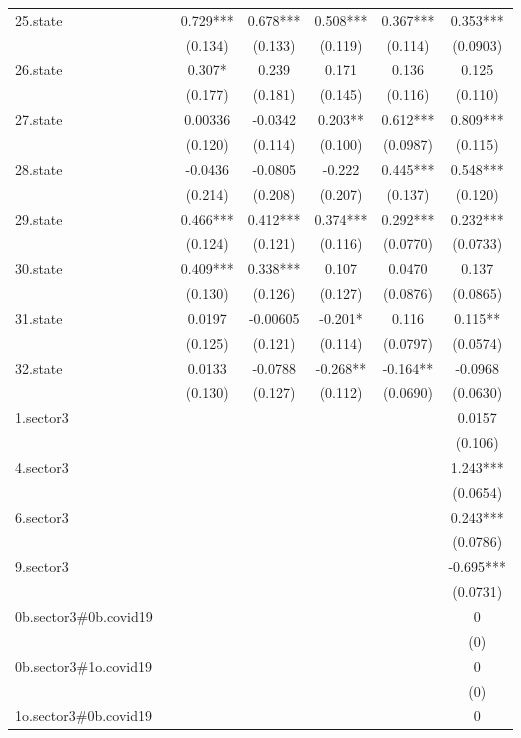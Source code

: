 \documentclass[]{article}
\begin{document}
\begin{tabular}{lcccccc}
25.state &  & 0.729*** & 0.678*** & 0.508*** & 0.367*** & 0.353*** \\
 &  & (0.134) & (0.133) & (0.119) & (0.114) & (0.0903) \\
26.state &  & 0.307* & 0.239 & 0.171 & 0.136 & 0.125 \\
 &  & (0.177) & (0.181) & (0.145) & (0.116) & (0.110) \\
27.state &  & 0.00336 & -0.0342 & 0.203** & 0.612*** & 0.809*** \\
 &  & (0.120) & (0.114) & (0.100) & (0.0987) & (0.115) \\
28.state &  & -0.0436 & -0.0805 & -0.222 & 0.445*** & 0.548*** \\
 &  & (0.214) & (0.208) & (0.207) & (0.137) & (0.120) \\
29.state &  & 0.466*** & 0.412*** & 0.374*** & 0.292*** & 0.232*** \\
 &  & (0.124) & (0.121) & (0.116) & (0.0770) & (0.0733) \\
30.state &  & 0.409*** & 0.338*** & 0.107 & 0.0470 & 0.137 \\
 &  & (0.130) & (0.126) & (0.127) & (0.0876) & (0.0865) \\
31.state &  & 0.0197 & -0.00605 & -0.201* & 0.116 & 0.115** \\
 &  & (0.125) & (0.121) & (0.114) & (0.0797) & (0.0574) \\
32.state &  & 0.0133 & -0.0788 & -0.268** & -0.164** & -0.0968 \\
 &  & (0.130) & (0.127) & (0.112) & (0.0690) & (0.0630) \\
1.sector3 &  &  &  &  &  & 0.0157 \\
 &  &  &  &  &  & (0.106) \\
4.sector3 &  &  &  &  &  & 1.243*** \\
 &  &  &  &  &  & (0.0654) \\
6.sector3 &  &  &  &  &  & 0.243*** \\
 &  &  &  &  &  & (0.0786) \\
9.sector3 &  &  &  &  &  & -0.695*** \\
 &  &  &  &  &  & (0.0731) \\
0b.sector3\#0b.covid19 &  &  &  &  &  & 0 \\
 &  &  &  &  &  & (0) \\
0b.sector3\#1o.covid19 &  &  &  &  &  & 0 \\
 &  &  &  &  &  & (0) \\
1o.sector3\#0b.covid19 &  &  &  &  &  & 0 \\

\end{tabular}
\end{document}
